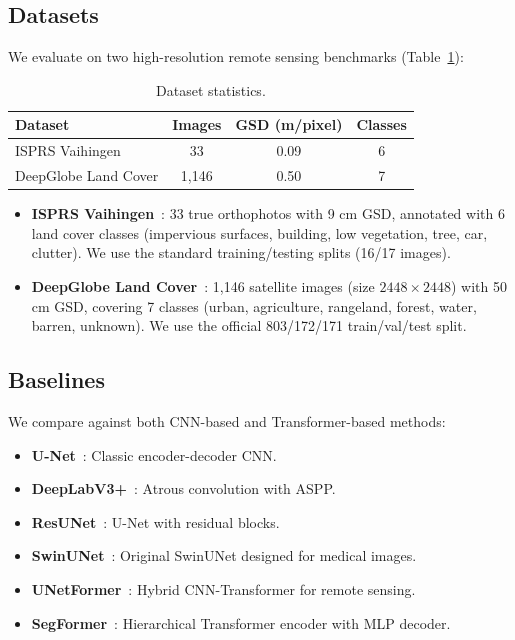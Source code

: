 \documentclass[conference]{IEEEtran}
\begin{document}
\subsection{Datasets}\label{sec:datasets}

We evaluate on two high-resolution remote sensing benchmarks (Table~\ref{tab:datasets}):

\begin{table}[t]
\centering
\caption{Dataset statistics.}
\label{tab:datasets}
\small
\begin{tabular}{lccc}
\toprule
\textbf{Dataset} & \textbf{Images} & \textbf{GSD (m/pixel)} & \textbf{Classes} \\
\midrule
ISPRS Vaihingen & 33 & 0.09 & 6 \\
DeepGlobe Land Cover & 1,146 & 0.50 & 7 \\
\bottomrule
\end{tabular}
\end{table}

\begin{itemize}
    \item \textbf{ISPRS Vaihingen}~\cite{isprs2013}: 33 true orthophotos with 9 cm GSD,
    annotated with 6 land cover classes (impervious surfaces, building, low vegetation,
    tree, car, clutter). We use the standard training/testing splits (16/17 images).
    \item \textbf{DeepGlobe Land Cover}~\cite{demir2018deepglobe}: 1,146 satellite images
    (size $2448\times 2448$) with 50 cm GSD, covering 7 classes (urban, agriculture,
    rangeland, forest, water, barren, unknown). We use the official 803/172/171 train/val/test split.
\end{itemize}

\subsection{Baselines}\label{sec:baselines}

We compare against both CNN-based and Transformer-based methods:
\begin{itemize}
    \item \textbf{U-Net}~\cite{ronneberger2015unet}: Classic encoder-decoder CNN.
    \item \textbf{DeepLabV3+}~\cite{chen2018deeplabv3plus}: Atrous convolution with ASPP.
    \item \textbf{ResUNet}~\cite{zhang2018resunet}: U-Net with residual blocks.
    \item \textbf{SwinUNet}~\cite{cao2022swinunet}: Original SwinUNet designed for medical images.
    \item \textbf{UNetFormer}~\cite{wang2022unetformer}: Hybrid CNN-Transformer for remote sensing.
    \item \textbf{SegFormer}~\cite{xie2021segformer}: Hierarchical Transformer encoder with MLP decoder.
\end{itemize}
\end{document}

